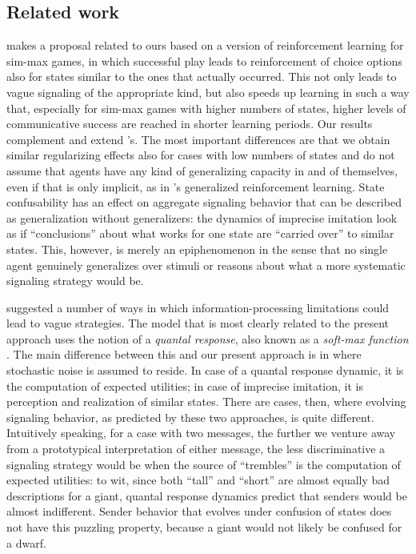 \documentclass[fleqn,reqno,10pt]{article}
\begin{document}
\subsection{Related work}
\citet{OConnor2013:The-Evolution-o} makes a proposal related to ours based on a version of
reinforcement learning for sim-max games, in which successful play leads to reinforcement of
choice options also for states similar to the ones that actually occurred. This not only leads
to vague signaling of the appropriate kind, but also speeds up learning in such a way that,
especially for sim-max games with higher numbers of states, higher levels of communicative
success are reached in shorter learning periods. Our results complement and extend
\citeauthor{OConnor2013:The-Evolution-o}'s. The most important differences are that we obtain
similar regularizing effects also for cases with low numbers of states and do not assume that
agents have any kind of generalizing capacity in and of themselves, even if that is only
implicit, as in \citeauthor{OConnor2013:The-Evolution-o}'s generalized reinforcement learning.
State confusability has an effect on aggregate signaling behavior that can be described as
generalization without generalizers: the dynamics of imprecise imitation look as if
``conclusions'' about what works for one state are ``carried over'' to similar states. This,
however, is merely an epiphenomenon in the sense that no single agent genuinely generalizes
over stimuli or reasons about what a more systematic signaling strategy would be.


\citet{FrankeJager2010:Vagueness-Signa} suggested a number of ways in which
in\-for\-ma\-tion-processing limitations could lead to vague strategies. The model that is most
clearly related to the present approach uses the notion of a \emph{quantal response}, also
known as a \emph{soft-max function}
\citep[e.g.][]{Luce1959:Individual-Choi,McFadden1976:Quantal-Choice-,GoereeHolt2008:Quantal-Respons}. The
main difference between this and our present approach is in where stochastic noise is assumed
to reside. In case of a quantal response dynamic, it is the computation of expected utilities;
in case of imprecise imitation, it is perception and realization of similar states. There are
cases, then, where evolving signaling behavior, as predicted by these two approaches, is quite
different. Intuitively speaking, for a case with two messages, the further we venture away from
a prototypical interpretation of either message, the less discriminative a signaling strategy
would be when the source of ``trembles'' is the computation of expected utilities: to wit,
since both ``tall'' and ``short'' are almost equally bad descriptions for a giant, quantal
response dynamics predict that senders would be almost indifferent. Sender behavior that
evolves under confusion of states does not have this puzzling property, because a giant would
not likely be confused for a dwarf. 
\end{document}
